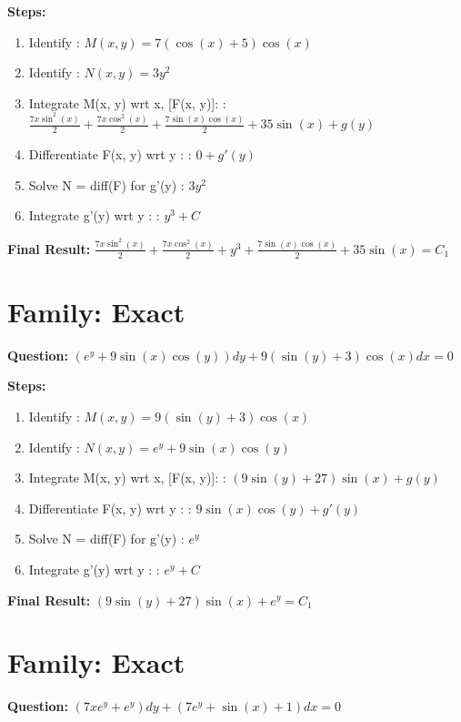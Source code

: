 \documentclass{article}
\begin{document}
\textbf{Steps:}
\begin{enumerate}
\item Identify :  $M(x, y) = 7 \left(\cos{\left(x \right)} + 5\right) \cos{\left(x \right)}$
\item Identify :  $N(x, y) = 3 y^{2}$
\item Integrate M(x, y) wrt x, [F(x, y)]: :  $\frac{7 x \sin^{2}{\left(x \right)}}{2} + \frac{7 x \cos^{2}{\left(x \right)}}{2} + \frac{7 \sin{\left(x \right)} \cos{\left(x \right)}}{2} + 35 \sin{\left(x \right)} + g(y)$
\item Differentiate F(x, y) wrt y :  :  $0 + g'(y)$
\item Solve N = diff(F) for g'(y) :  $3 y^{2}$
\item Integrate g'(y) wrt y :  :  $y^{3} + C$
\end{enumerate}
\textbf{Final Result:} $\frac{7 x \sin^{2}{\left(x \right)}}{2} + \frac{7 x \cos^{2}{\left(x \right)}}{2} + y^{3} + \frac{7 \sin{\left(x \right)} \cos{\left(x \right)}}{2} + 35 \sin{\left(x \right)} = C_{1}$

\section*{Family: Exact}
\textbf{Question:} $\left(e^{y} + 9 \sin{\left(x \right)} \cos{\left(y \right)}\right) dy + 9 \left(\sin{\left(y \right)} + 3\right) \cos{\left(x \right)} dx = 0$

\textbf{Steps:}
\begin{enumerate}
\item Identify :  $M(x, y) = 9 \left(\sin{\left(y \right)} + 3\right) \cos{\left(x \right)}$
\item Identify :  $N(x, y) = e^{y} + 9 \sin{\left(x \right)} \cos{\left(y \right)}$
\item Integrate M(x, y) wrt x, [F(x, y)]: :  $\left(9 \sin{\left(y \right)} + 27\right) \sin{\left(x \right)} + g(y)$
\item Differentiate F(x, y) wrt y :  :  $9 \sin{\left(x \right)} \cos{\left(y \right)} + g'(y)$
\item Solve N = diff(F) for g'(y) :  $e^{y}$
\item Integrate g'(y) wrt y :  :  $e^{y} + C$
\end{enumerate}
\textbf{Final Result:} $\left(9 \sin{\left(y \right)} + 27\right) \sin{\left(x \right)} + e^{y} = C_{1}$

\section*{Family: Exact}
\textbf{Question:} $\left(7 x e^{y} + e^{y}\right) dy + \left(7 e^{y} + \sin{\left(x \right)} + 1\right) dx = 0$
\end{document}
